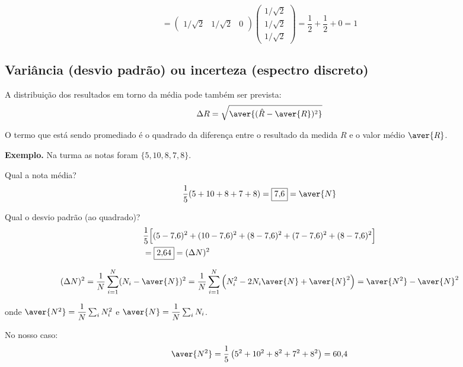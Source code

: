 \begin{equation}
    = \begin{pmatrix} 1/\sqrt{2} & 1/\sqrt{2} & 0 \end{pmatrix}
    \begin{pmatrix} 1/\sqrt{2} \\ 1/\sqrt{2} \\ 1/\sqrt{2} \end{pmatrix}
    = \frac{1}{2} + \frac{1}{2} + 0 = \boxed{1}
\label{eq:aula12_R_matricial_resultado}
\end{equation}

\subsection*{Variância (desvio padrão) ou incerteza (espectro discreto)}

A distribuição dos resultados em torno da média pode também ser prevista:
\begin{equation}
    \Delta R = \sqrt{\aver{(\hat{R} - \aver{R})^2}}
\label{eq:aula12_def_incerteza}
\end{equation}

O termo que está sendo promediado é o quadrado da diferença entre o resultado da medida $R$ e o valor médio $\aver{R}$.

\textbf{Exemplo.} Na turma as notas foram $\{5, 10, 8, 7, 8\}$.

Qual a nota média?
\begin{equation}
    \frac{1}{5}(5+10+8+7+8) = \boxed{7{,}6} = \aver{N}
\label{eq:aula12_nota_media}
\end{equation}

Qual o desvio padrão (ao quadrado)?
\begin{align}
    &\frac{1}{5}\Big[(5-7{,}6)^2 + (10-7{,}6)^2 + (8-7{,}6)^2 + (7-7{,}6)^2 + (8-7{,}6)^2\Big] \notag \\
    &= \boxed{2{,}64} = (\Delta N)^2
\label{eq:aula12_desvio_notas}
\end{align}

\begin{equation}
    (\Delta N)^2 = \frac{1}{N}\sum_{i=1}^{N}(N_i - \aver{N})^2 = \frac{1}{N}\sum_{i=1}^{N}\left(N_i^2 - 2N_i\aver{N} + \aver{N}^2\right) = \aver{N^2} - \aver{N}^2
\label{eq:aula12_desvio_expandido}
\end{equation}

onde $\aver{N^2} = \dfrac{1}{N}\sum_i N_i^2$ e $\aver{N} = \dfrac{1}{N}\sum_i N_i$.

No nosso caso:
\begin{equation}
    \aver{N^2} = \frac{1}{5}\left(5^2+10^2+8^2+7^2+8^2\right) = 60{,}4
\label{eq:aula12_N2_medio}
\end{equation}

